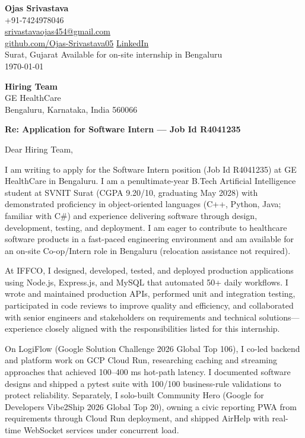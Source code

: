 \documentclass[a4paper,11pt]{article}
\begin{document}
\begin{flushright}
\textbf{Ojas Srivastava} \\
+91-7424978046 \\
\href{mailto:srivastavaojas454@gmail.com}{srivastavaojas454@gmail.com} \\
\href{https://github.com/Ojas-Srivastava05}{github.com/Ojas-Srivastava05} \textbar{}
\href{https://linkedin.com/in/ojas-srivastava05}{LinkedIn} \\
Surat, Gujarat \textbar{} Available for on-site internship in Bengaluru \\
\today
\end{flushright}

\vspace{4mm}
\textbf{Hiring Team} \\
GE HealthCare \\
Bengaluru, Karnataka, India 560066

\vspace{2mm}
\textbf{Re: Application for Software Intern --- Job Id R4041235}

Dear Hiring Team,

I am writing to apply for the Software Intern position (Job Id R4041235) at GE HealthCare in Bengaluru. I am a penultimate-year B.Tech Artificial Intelligence student at SVNIT Surat (CGPA 9.20/10, graduating May 2028) with demonstrated proficiency in object-oriented languages (C++, Python, Java; familiar with C\#) and experience delivering software through design, development, testing, and deployment. I am eager to contribute to healthcare software products in a fast-paced engineering environment and am available for an on-site Co-op/Intern role in Bengaluru (relocation assistance not required).

At IFFCO, I designed, developed, tested, and deployed production applications using Node.js, Express.js, and MySQL that automated 50+ daily workflows. I wrote and maintained production APIs, performed unit and integration testing, participated in code reviews to improve quality and efficiency, and collaborated with senior engineers and stakeholders on requirements and technical solutions---experience closely aligned with the responsibilities listed for this internship.

On LogiFlow (Google Solution Challenge 2026 Global Top 106), I co-led backend and platform work on GCP Cloud Run, researching caching and streaming approaches that achieved 100--400 ms hot-path latency. I documented software designs and shipped a pytest suite with 100/100 business-rule validations to protect reliability. Separately, I solo-built Community Hero (Google for Developers Vibe2Ship 2026 Global Top 20), owning a civic reporting PWA from requirements through Cloud Run deployment, and shipped AirHelp with real-time WebSocket services under concurrent load.
\end{document}
